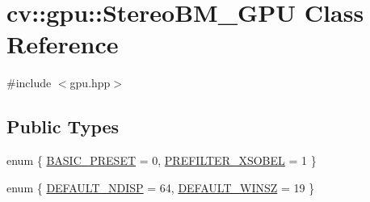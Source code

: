 \hypertarget{classcv_1_1gpu_1_1StereoBM__GPU}{\section{cv\-:\-:gpu\-:\-:Stereo\-B\-M\-\_\-\-G\-P\-U Class Reference}
\label{classcv_1_1gpu_1_1StereoBM__GPU}
}


{\ttfamily \#include $<$gpu.\-hpp$>$}

\subsection*{Public Types}
\begin{DoxyCompactItemize}
\item 
enum \{ \hyperlink{classcv_1_1gpu_1_1StereoBM__GPU_ab6be9fb8b692f759a914f735b4d22fb6a6a063c792e691b89f89e3b9d60dc2b23}{B\-A\-S\-I\-C\-\_\-\-P\-R\-E\-S\-E\-T} = 0, 
\hyperlink{classcv_1_1gpu_1_1StereoBM__GPU_ab6be9fb8b692f759a914f735b4d22fb6a1ea84e0b03274cb2b6a55b3c8c4e5ee2}{P\-R\-E\-F\-I\-L\-T\-E\-R\-\_\-\-X\-S\-O\-B\-E\-L} = 1
 \}
\item 
enum \{ \hyperlink{classcv_1_1gpu_1_1StereoBM__GPU_a9634c58ae2540020ce01fe00c3a076f0a49001735748b7f3d533568c30a578f36}{D\-E\-F\-A\-U\-L\-T\-\_\-\-N\-D\-I\-S\-P} = 64, 
\hyperlink{classcv_1_1gpu_1_1StereoBM__GPU_a9634c58ae2540020ce01fe00c3a076f0af32dfd5296df828cdb74893979fad282}{D\-E\-F\-A\-U\-L\-T\-\_\-\-W\-I\-N\-S\-Z} = 19
 \}
\end{DoxyCompactItemize}
